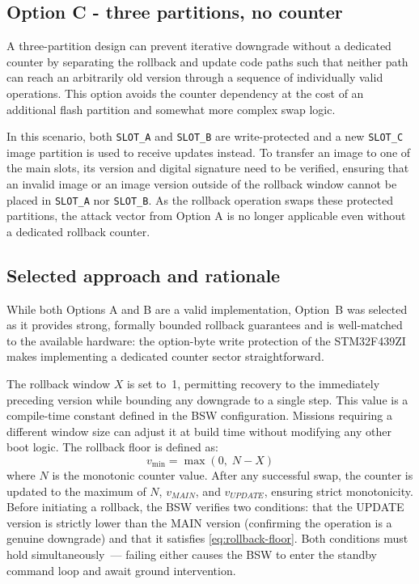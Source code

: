 \subsection{Option C - three partitions, no counter}
\label{sub:rollback-c}

A three-partition design can prevent iterative downgrade without a dedicated counter by separating the rollback and update code paths such that neither path can reach an arbitrarily old version through a sequence of individually valid operations. This option avoids the counter dependency at the cost of an additional flash partition and somewhat more complex swap logic.

In this scenario, both \texttt{SLOT\_A} and \texttt{SLOT\_B} are write-protected and a new \texttt{SLOT\_C} image partition is used to receive updates instead. To transfer an image to one of the main slots, its version and digital signature need to be verified, ensuring that an invalid image or an image version outside of the rollback window cannot be placed in \texttt{SLOT\_A} nor \texttt{SLOT\_B}. As the rollback operation swaps these protected partitions, the attack vector from Option A is no longer applicable even without a dedicated rollback counter.

\subsection{Selected approach and rationale}

While both Options A and B are a valid implementation, Option~B was selected as it provides strong, formally bounded rollback guarantees and is well-matched to the available hardware: the option-byte write protection of the STM32F439ZI makes implementing a dedicated counter sector straightforward.

The rollback window $X$ is set to~1, permitting recovery to the immediately preceding version while bounding any downgrade to a single step. This value is a compile-time constant defined in the BSW configuration. Missions requiring a different window size can adjust it at build time without modifying any other boot logic.
The rollback floor is defined as:
%
\begin{equation}
    v_{\min} = \max(0,\; N - X)
    \label{eq:rollback-floor}
\end{equation}
%
where $N$ is the monotonic counter value.
After any successful swap, the counter is updated to the maximum of
$N$, $v_{MAIN}$, and $v_{UPDATE}$, ensuring strict monotonicity. Before initiating a rollback, the BSW verifies two conditions: that the UPDATE version is strictly lower than the MAIN version (confirming the operation is a genuine downgrade) and that it satisfies \autoref{eq:rollback-floor}. Both conditions must hold simultaneously~--- failing either causes the BSW to enter the standby command loop and await ground intervention.

